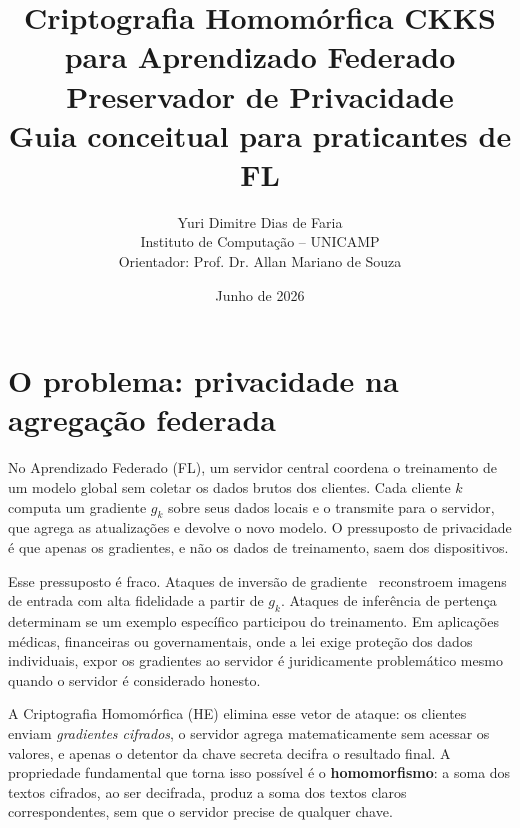 \documentclass[11pt,a4paper]{article}
\begin{document}
\title{\textbf{Criptografia Homomórfica CKKS\\
para Aprendizado Federado Preservador de Privacidade}\\[0.4em]
\large Guia conceitual para praticantes de FL}
\author{Yuri Dimitre Dias de Faria\\
\small Instituto de Computação -- UNICAMP\\
\small Orientador: Prof. Dr. Allan Mariano de Souza}
\date{Junho de 2026}
\maketitle

\section{O problema: privacidade na agregação federada}
\label{sec:problema}

No Aprendizado Federado (FL), um servidor central coordena o treinamento de um
modelo global sem coletar os dados brutos dos clientes. Cada cliente $k$ computa
um gradiente $g_k$ sobre seus dados locais e o transmite para o servidor, que
agrega as atualizações e devolve o novo modelo. O pressuposto de privacidade é que
apenas os gradientes, e não os dados de treinamento, saem dos dispositivos.

Esse pressuposto é fraco. Ataques de inversão de gradiente~\cite{Geiping2020}
reconstroem imagens de entrada com alta fidelidade a partir de $g_k$. Ataques de
inferência de pertença~\cite{Shokri2017} determinam se um exemplo específico
participou do treinamento. Em aplicações médicas, financeiras ou governamentais,
onde a lei exige proteção dos dados individuais, expor os gradientes ao servidor é
juridicamente problemático mesmo quando o servidor é considerado honesto.

A Criptografia Homomórfica (HE) elimina esse vetor de ataque: os clientes enviam
\emph{gradientes cifrados}, o servidor agrega matematicamente sem acessar os valores,
e apenas o detentor da chave secreta decifra o resultado final. A propriedade
fundamental que torna isso possível é o \textbf{homomorfismo}: a soma dos textos
cifrados, ao ser decifrada, produz a soma dos textos claros correspondentes,
sem que o servidor precise de qualquer chave.

\end{document}
